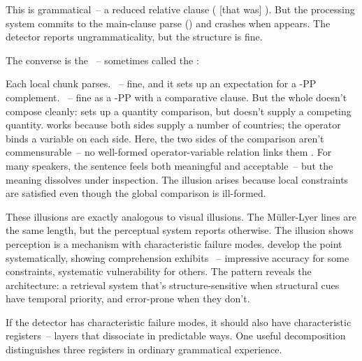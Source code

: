 \z

This is grammatical~-- a reduced relative clause ( [that was] ). But the processing system commits to the main-clause parse () and crashes when  appears. The detector reports ungrammaticality, but the structure is fine.

The converse is the ~-- sometimes called the  \citep{Wellwood2018}:

\z

Each local chunk parses. ~-- fine, and it sets up an expectation for a -PP complement. ~-- fine as a -PP with a comparative clause. But the whole doesn't compose cleanly:  sets up a quantity comparison, but  doesn't supply a competing quantity.  works because both sides supply a number of countries; the operator binds a variable on each side. Here, the two sides of the comparison aren't commensurable~-- no well-formed operator-variable relation links them \citep{Wellwood2018}. For many speakers, the sentence feels both meaningful and acceptable~-- but the meaning dissolves under inspection. The illusion arises because local constraints are satisfied even though the global comparison is ill-formed.

These illusions are exactly analogous to visual illusions. The Müller-Lyer lines are the same length, but the perceptual system reports otherwise. The illusion shows perception is a mechanism with characteristic failure modes. \textcite{phillips2011grammatical} develop the point systematically, showing comprehension exhibits ~-- impressive accuracy for some constraints, systematic vulnerability for others. The pattern reveals the architecture: a retrieval system that's structure-sensitive when structural cues have temporal priority, and error-prone when they don't.


If the detector has characteristic failure modes, it should also have characteristic registers~-- layers that dissociate in predictable ways. One useful decomposition distinguishes three registers in ordinary grammatical experience.

